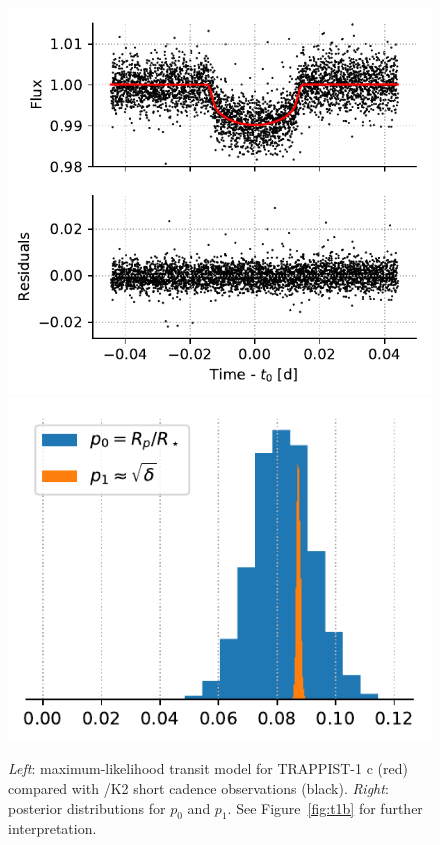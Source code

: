 \begin{figure}%
    \centering
    \includegraphics[scale=0.75]{robin/trappist1c_residuals.pdf}
    \includegraphics[scale=0.75]{robin/trappist1c_agreement.pdf}
    \caption{\textsl{Left}: maximum-likelihood transit model for TRAPPIST-1 c (red) compared with \kepler/K2 short cadence observations (black). \textsl{Right}: posterior distributions for $p_0$ and $p_1$. See Figure~\ref{fig:t1b} for further interpretation.}
    \label{fig:t1c}
\end{figure}

